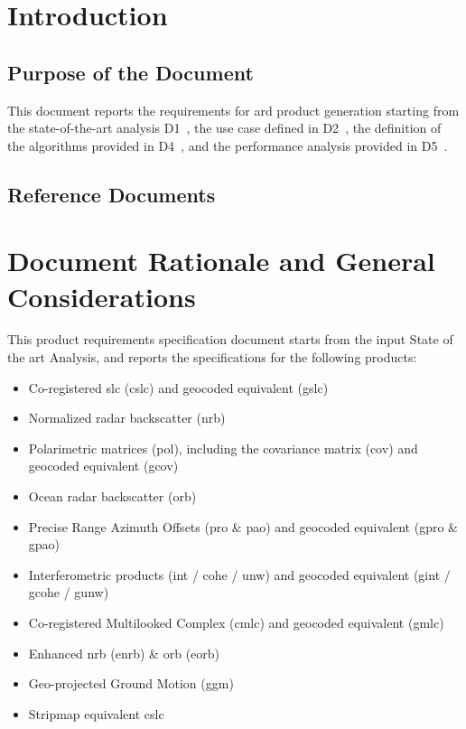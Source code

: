 \section{Introduction}

\subsection{Purpose of the Document}
This document reports the requirements for \acs{ard} product generation starting from the state-of-the-art analysis D1~\cite{D1}, the use case defined in D2~\cite{D2}, the definition of the algorithms provided in D4~\cite{D4}, and the performance analysis provided in D5~\cite{D5}. 

\subsection{Reference Documents}

\renewcommand{\refname}{}
\vspace{-2em}



\clearpage

\section{Document Rationale and General Considerations}
This product requirements specification document starts from the input State of the art Analysis, and reports the specifications for the following products:
    \begin{itemize}
        \item Co-registered \acs{slc} (\acs{cslc}) and geocoded equivalent (\acs{gslc})
        \item Normalized radar backscatter (\acs{nrb})
        \item Polarimetric matrices (\acs{pol}), including the covariance matrix (\acs{cov}) and geocoded equivalent (\acs{gcov})
        \item Ocean radar backscatter (\acs{orb})
        \item Precise Range Azimuth Offsets (\acs{pro} \& \acs{pao}) and geocoded equivalent (\acs{gpro} \& \acs{gpao})
        \item Interferometric products (\acs{int} / \acs{cohe} / \acs{unw}) and geocoded equivalent (\acs{gint} / \acs{gcohe} / \acs{gunw})
        \item Co-registered Multilooked Complex (\acs{cmlc}) and geocoded equivalent (\acs{gmlc})
        \item Enhanced \acs{nrb} (\acs{enrb}) \& \acs{orb} (\acs{eorb})
        \item Geo-projected Ground Motion (\acs{ggm})
        \item Stripmap equivalent \acs{cslc}
    \end{itemize}

